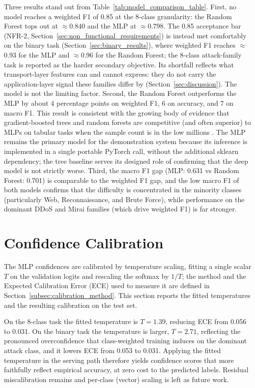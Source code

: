 \par Three results stand out from Table~\ref{tab:model_comparison_table}. First, no model reaches a weighted F1 of 0.85 at the 8-class granularity: the Random Forest tops out at $\approx$0.840 and the MLP at $\approx$0.798. The 0.85 acceptance bar (NFR-2, Section~\ref{sec:non_functional_requirements}) is instead met comfortably on the binary task (Section~\ref{sec:binary_results}), where weighted F1 reaches $\approx$0.93 for the MLP and $\approx$0.96 for the Random Forest; the 8-class attack-family task is reported as the harder secondary objective. Its shortfall reflects what transport-layer features can and cannot express: they do not carry the application-layer signal these families differ by (Section~\ref{sec:discussion}). The model is not the limiting factor. Second, the Random Forest outperforms the MLP by about 4 percentage points on weighted F1, 6 on accuracy, and 7 on macro F1. This result is consistent with the growing body of evidence that gradient-boosted trees and random forests are competitive (and often superior) to MLPs on tabular tasks when the sample count is in the low millions \cite{Kadra2021}. The MLP remains the primary model for the demonstration system because its inference is implemented in a single portable PyTorch call, without the additional sklearn dependency; the tree baseline serves its designed role of confirming that the deep model is not strictly worse. Third, the macro F1 gap (MLP: 0.631 vs Random Forest: 0.701) is comparable to the weighted F1 gap, and the low macro F1 of both models confirms that the difficulty is concentrated in the minority classes (particularly Web, Reconnaissance, and Brute Force), while performance on the dominant DDoS and Mirai families (which drive weighted F1) is far stronger.


\section{Confidence Calibration}
\label{sec:calibration}

\par The MLP confidences are calibrated by temperature scaling, fitting a single scalar $T$ on the validation logits and rescaling the softmax by $1/T$; the method and the Expected Calibration Error (ECE) used to measure it are defined in Section~\ref{subsec:calibration_method}. This section reports the fitted temperatures and the resulting calibration on the test set.

\par On the 8-class task the fitted temperature is $T = 1.39$, reducing ECE from 0.056 to 0.031. On the binary task the temperature is larger, $T = 2.71$, reflecting the pronounced overconfidence that class-weighted training induces on the dominant attack class, and it lowers ECE from 0.053 to 0.031. Applying the fitted temperature in the serving path therefore yields confidence scores that more faithfully reflect empirical accuracy, at zero cost to the predicted labels. Residual miscalibration remains and per-class (vector) scaling is left as future work.

